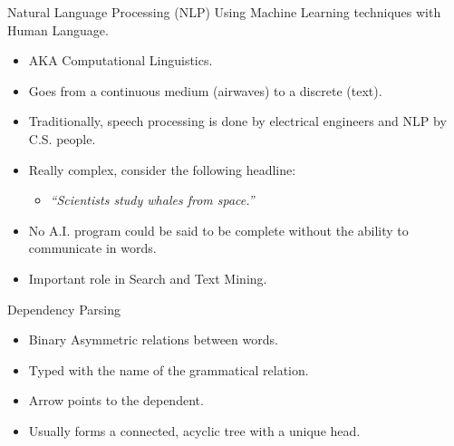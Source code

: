 \documentclass[9pt]{beamer}
\begin{document}
\begin{frame}{Natural Language Processing (NLP)}
    Using Machine Learning techniques with Human Language.
    \begin{itemize}
            \item AKA Computational Linguistics.
            \item Goes from a continuous medium (airwaves) to a discrete (text).
        \item Traditionally, speech processing is done by electrical engineers and NLP by C.S. people.
            \item Really complex, consider the following headline:
                \begin{itemize}
                    \item \textit{``Scientists study whales from space.''}
                \end{itemize}
    \item No A.I. program could be said to be complete without the ability to communicate in words.
        \item Important role in Search and Text Mining.
    \end{itemize}
     
\end{frame}


\begin{frame}{Dependency Parsing}
    \begin{itemize}
            \item Binary Asymmetric relations between words.
            \item Typed with the name of the grammatical relation.
            \item Arrow points to the dependent.
            \item Usually forms a connected, acyclic tree with a unique head.
    \end{itemize}
\end{frame}
\end{document}
